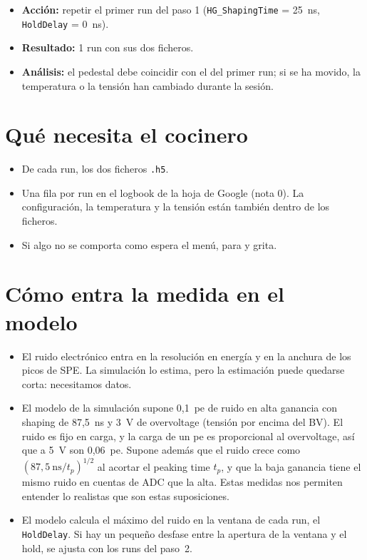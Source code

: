 \documentclass[11pt,a4paper]{article}
\begin{document}
\begin{itemize}
\item {\bf Acción:} repetir el primer run del paso 1
  (\texttt{HG\_ShapingTime} = 25~ns, \texttt{HoldDelay} = 0~ns).
\item {\bf Resultado:} 1 run con sus dos ficheros.
\item {\bf Análisis:} el pedestal debe coincidir con el del primer run; si
  se ha movido, la temperatura o la tensión han cambiado durante la sesión.
\end{itemize}

\section*{Qué necesita el cocinero}

\begin{itemize}
\item De cada run, los dos ficheros \texttt{.h5}.
\item Una fila por run en el logbook de la hoja de Google (nota 0). La
  configuración, la temperatura y la tensión están también dentro de los
  ficheros.
\item Si algo no se comporta como espera el menú, para y grita.
\end{itemize}

\section{Cómo entra la medida en el modelo}
\label{sec:razon}

\begin{itemize}
\item El ruido electrónico entra en la resolución en energía y en la
  anchura de los picos de SPE. La simulación lo estima, pero la estimación
  puede quedarse corta: necesitamos datos.
\item El modelo de la simulación supone 0,1~pe de ruido en alta ganancia con
  shaping de 87,5~ns y 3~V de overvoltage (tensión por encima del BV). El
  ruido es fijo en carga, y la carga de un pe es proporcional al
  overvoltage, así que a 5~V son 0,06~pe. Supone además que el ruido crece
  como $(87{,}5~\mathrm{ns}/t_p)^{1/2}$ al acortar el peaking time $t_p$, y
  que la baja ganancia tiene el mismo ruido en cuentas de ADC que la alta.
  Estas medidas nos permiten entender lo realistas que son estas
  suposiciones.
\item El modelo calcula el máximo del ruido en la ventana de cada run, el
  \texttt{HoldDelay}. Si hay un pequeño desfase entre la apertura de la
  ventana y el hold, se ajusta con los runs del paso~2.
\end{itemize}
\end{document}
